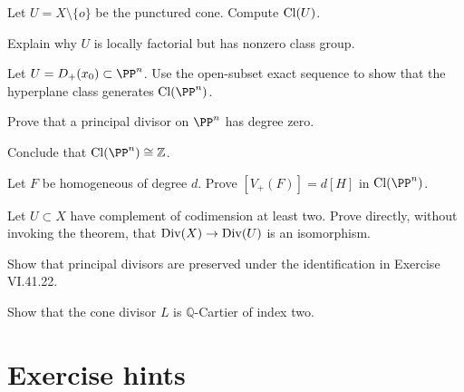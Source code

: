 \begin{exercise}\label{exr:vi41-16}
Let \(U=X\setminus\{o\}\) be the punctured cone. Compute \(\operatorname{Cl}(U)\).
\end{exercise}

\begin{exercise}\label{exr:vi41-17}
Explain why \(U\) is locally factorial but has nonzero class group.
\end{exercise}

\begin{exercise}\label{exr:vi41-18}
Let \(U=D_+(x_0)\subset\PP^n\). Use the open-subset exact sequence to show that the hyperplane class generates \(\Cl(\PP^n)\).
\end{exercise}

\begin{exercise}\label{exr:vi41-19}
Prove that a principal divisor on \(\PP^n\) has degree zero.
\end{exercise}

\begin{exercise}\label{exr:vi41-20}
Conclude that \(\Cl(\PP^n)\cong\mathbb Z\).
\end{exercise}

\begin{exercise}\label{exr:vi41-21}
Let \(F\) be homogeneous of degree \(d\). Prove \([V_+(F)]=d[H]\) in \(\Cl(\PP^n)\).
\end{exercise}

\begin{exercise}\label{exr:vi41-22}
Let \(U\subset X\) have complement of codimension at least two. Prove directly, without invoking the theorem, that \(\operatorname{Div}(X)\to\operatorname{Div}(U)\) is an isomorphism.
\end{exercise}

\begin{exercise}\label{exr:vi41-23}
Show that principal divisors are preserved under the identification in Exercise VI.41.22.
\end{exercise}

\begin{exercise}\label{exr:vi41-24}
Show that the cone divisor \(L\) is \(\mathbb Q\)-Cartier of index two.
\end{exercise}

\ifdefined\IncludeExerciseHints
\section{Exercise hints}

\fi
\ifdefined\IncludeExerciseSolutions

